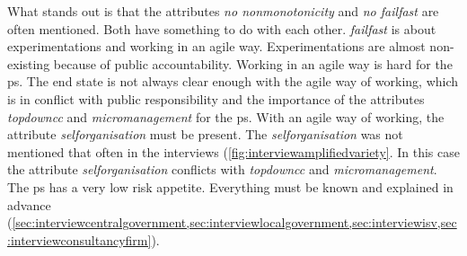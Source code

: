 What stands out is that the \glspl{attribute} \textit{no \gls{nonmonotonicity}} and \textit{no \gls{failfast}} are often mentioned. Both have something to do with each other. \textit{\Gls{failfast}} is about experimentations and working in an \gls{agile} way. Experimentations are almost non-existing because of public accountability. Working in an \gls{agile} way is hard for the \gls{ps}. The end state is not always clear enough with the \gls{agile} way of working, which is in conflict with public responsibility and the importance of the attributes \textit{\gls{topdowncc}} and \textit{\gls{micromanagement}} for the \gls{ps}. With an \gls{agile} way of working, the attribute \textit{\gls{selforganisation}} must be present. The \textit{\gls{selforganisation}} was not mentioned that often in the interviews (\cref{fig:interviewamplifiedvariety}. In this case the \gls{attribute} \textit{\gls{selforganisation}} conflicts with \textit{\gls{topdowncc}} and \textit{\gls{micromanagement}}. The \gls{ps} has a very low risk appetite. Everything must be known and explained in advance (\cref{sec:interviewcentralgovernment,sec:interviewlocalgovernment,sec:interviewisv,sec:interviewconsultancyfirm}). 
